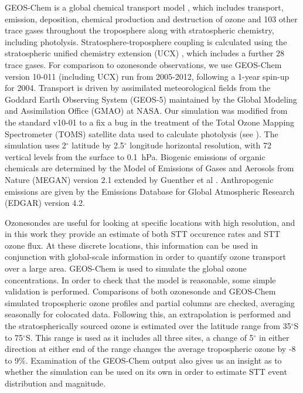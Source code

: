\documentclass{article}
\begin{document}
  GEOS-Chem is a global chemical transport model \citep{Bey2001}, which includes transport, emission, deposition, chemical production and destruction of ozone and 103 other trace gases throughout the troposphere along with stratospheric chemistry, including photolysis. 
  Stratosphere-troposphere coupling is calculated using the stratospheric unified chemistry extension (UCX) \citep{Eastham2014}, which includes a further 28 trace gases.
  For comparison to ozonesonde observations, we use GEOS-Chem version 10-011 (including UCX) run from 2005-2012, following a 1-year spin-up for 2004.
  Transport is driven by assimilated meteorological fields from the Goddard Earth Observing System (GEOS-5) maintained by the Global Modeling and Assimilation Office (GMAO) at NASA.
  Our simulation was modified from the standard v10-01 to a fix a bug in the treatment of the Total Ozone Mapping Spectrometer (TOMS) satellite data used to calculate photolysis (see \citet{TomsFix2016}).
  The simulation uses 2$^{\circ}$ latitude by 2.5$^{\circ}$ longitude horizontal resolution, with 72 vertical levels from the surface to 0.1~hPa.
  Biogenic emissions of organic chemicals are determined by the Model of Emissions of Gases and Aerosols from Nature (MEGAN) version 2.1 extended by Guenther et al \citep{Guenther2012}.
  Anthropogenic emissions are given by the Emissions Database for Global Atmospheric Research (EDGAR) version 4.2.
  
  Ozonesondes are useful for looking at specific locations with high resolution, and in this work they provide an estimate of both STT occurence rates and STT ozone flux.
  At these discrete locations, this information can be used in conjunction with global-scale information in order to quantify ozone transport over a large area.
  GEOS-Chem is used to simulate the global ozone concentrations.
  In order to check that the model is reasonable, some simple validation is performed.
  Comparisons of both ozonesonde and GEOS-Chem simulated tropospheric ozone profiles and partial columns are checked, averaging seasonally for colocated data.
  Following this, an extrapolation is performed and the stratospherically sourced ozone is estimated over the latitude range from 35$^{\circ}$S to 75$^{\circ}$S.
  This range is used as it includes all three sites, a change of 5$^{\circ}$ in either direction at either end of the range changes the average tropospheric ozone by -8 to 9\%.
  Examination of the GEOS-Chem output also gives us an insight as to whether the simulation can be used on its own in order to estimate STT event distribution and magnitude.
  
\end{document}
